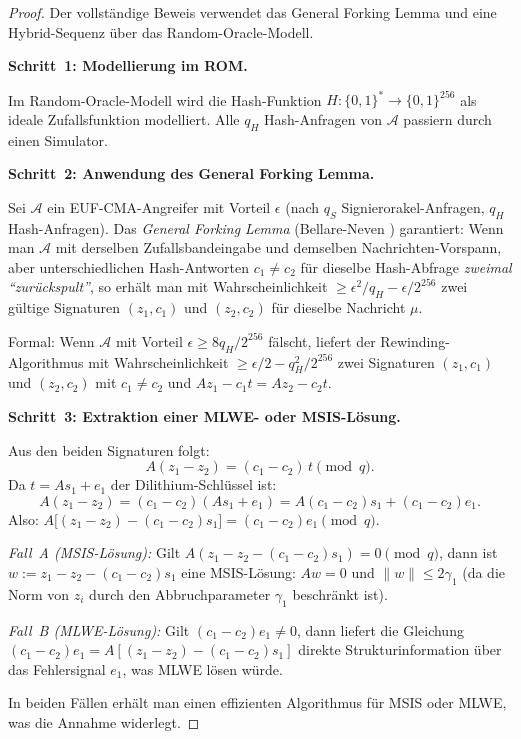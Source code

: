 ﻿\documentclass[a4paper,12pt]{article}
\theoremstyle{definition}
\begin{document}
\begin{proof}
Der vollständige Beweis verwendet das General Forking Lemma und eine
Hybrid-Sequenz über das Random-Oracle-Modell.

\textbf{Schritt~1: Modellierung im ROM.}

Im Random-Oracle-Modell wird die Hash-Funktion $H: \{0,1\}^* \to \{0,1\}^{256}$
als ideale Zufallsfunktion modelliert. Alle $q_H$ Hash-Anfragen von $\mathcal{A}$
passiern durch einen Simulator.

\textbf{Schritt~2: Anwendung des General Forking Lemma.}

Sei $\mathcal{A}$ ein EUF-CMA-Angreifer mit Vorteil $\epsilon$ (nach $q_S$
Signierorakel-Anfragen, $q_H$ Hash-Anfragen). Das \emph{General Forking Lemma}
(Bellare-Neven \cite{BN06}) garantiert: Wenn man $\mathcal{A}$ mit derselben
Zufallsbandeingabe und demselben Nachrichten-Vorspann, aber unterschiedlichen
Hash-Antworten $c_1 \neq c_2$ für dieselbe Hash-Abfrage
\emph{zweimal ``zurückspult''}, so erhält man mit Wahrscheinlichkeit
$\geq \epsilon^2 / q_H - \epsilon / 2^{256}$
zwei gültige Signaturen $(z_1, c_1)$ und $(z_2, c_2)$ für dieselbe Nachricht $\mu$.

Formal: Wenn $\mathcal{A}$ mit Vorteil $\epsilon \geq 8 q_H / 2^{256}$ fälscht,
liefert der Rewinding-Algorithmus mit Wahrscheinlichkeit
$\geq \epsilon/2 - q_H^2/2^{256}$
zwei Signaturen $(z_1, c_1)$ und $(z_2, c_2)$ mit
$c_1 \neq c_2$ und $Az_1 - c_1 t = Az_2 - c_2 t$.

\textbf{Schritt~3: Extraktion einer MLWE- oder MSIS-Lösung.}

Aus den beiden Signaturen folgt:
\[
  A(z_1 - z_2) = (c_1 - c_2)\,t \pmod{q}.
\]
Da $t = As_1 + e_1$ der Dilithium-Schlüssel ist:
\[
  A(z_1 - z_2) = (c_1 - c_2)(As_1 + e_1) = A(c_1-c_2)s_1 + (c_1-c_2)e_1.
\]
Also: $A\bigl[(z_1 - z_2) - (c_1-c_2)s_1\bigr] = (c_1-c_2)e_1 \pmod{q}$.

\emph{Fall~A (MSIS-Lösung):}
Gilt $A(z_1-z_2-(c_1-c_2)s_1) = 0 \pmod{q}$, dann ist
$w := z_1 - z_2 - (c_1-c_2)s_1$ eine MSIS-Lösung:
$Aw = 0$ und $\|w\| \leq 2\gamma_1$
(da die Norm von $z_i$ durch den Abbruchparameter $\gamma_1$ beschränkt ist).

\emph{Fall~B (MLWE-Lösung):}
Gilt $(c_1-c_2)e_1 \neq 0$, dann liefert die Gleichung
$(c_1-c_2)e_1 = A[(z_1-z_2)-(c_1-c_2)s_1]$
direkte Strukturinformation über das Fehlersignal $e_1$,
was MLWE lösen würde.

In beiden Fällen erhält man einen effizienten Algorithmus für MSIS oder MLWE,
was die Annahme widerlegt.


\end{proof}
\end{document}
